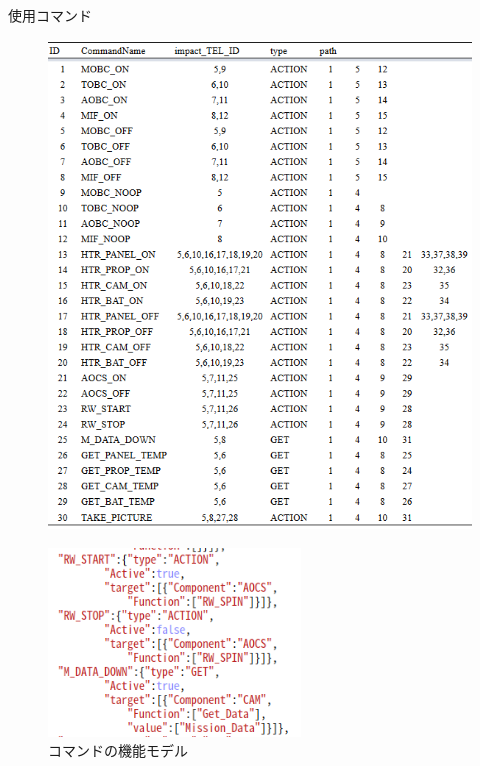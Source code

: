 \documentclass[11pt]{jsreport}
\begin{document}
\newpage
\begin{table}[H]
   \centering
   \caption{使用コマンド}
   \label{tab:command}
\end{table}
\vspace{-2zh}
\begin{figure}[H]
   \centering
      \includegraphics[width=13cm]{figure/COM.png}
\end{figure}

\begin{figure}[H]
   \centering
      \includegraphics[height=5.0cm]{figure/COM_type.png}
      \caption{コマンドの機能モデル}
      \label{fig:COM_type}
\end{figure}
\end{document}
